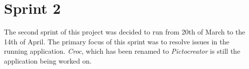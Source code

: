 \chapter{Sprint 2}
The second sprint of this project was decided to run from 20th of March to the 14th of April.
The primary focus of this sprint was to resolve issues in the running application.
\textit{Croc}, which has been renamed to \textit{Pictocreator} is still the application being worked on.



